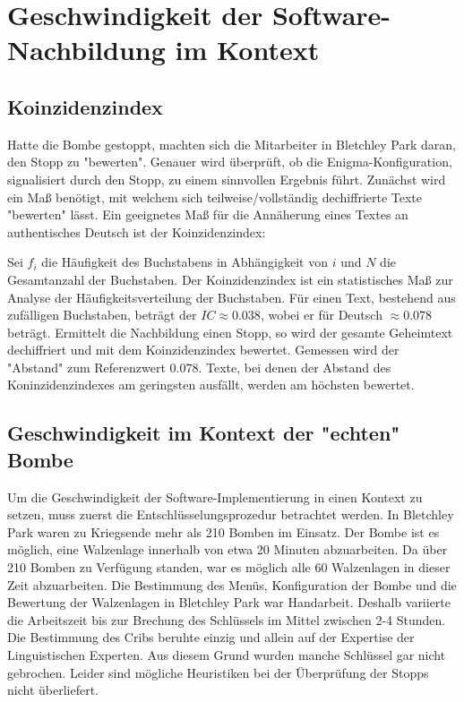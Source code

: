 \chapter{Geschwindigkeit der Software-Nachbildung im Kontext}\label{ch:speed}

\section{Koinzidenzindex}\label{sec:koinzidenzindex}
Hatte die Bombe gestoppt, machten sich die Mitarbeiter in Bletchley Park daran, den Stopp zu "bewerten". 
Genauer wird überprüft, ob die Enigma-Konfiguration, signalisiert durch den Stopp, zu einem sinnvollen Ergebnis führt.
Zunächst wird ein Maß benötigt, mit welchem sich teilweise/vollständig dechiffrierte Texte "bewerten" lässt.
Ein geeignetes Maß für die Annäherung eines Textes an authentisches Deutsch ist der Koinzidenzindex:

	
	
Sei $f_i$ die Häufigkeit des Buchstabens in Abhängigkeit von $i$ und $N$ die Gesamtanzahl der Buchstaben.
Der Koinzidenzindex ist ein statistisches Maß zur Analyse der Häufigkeitsverteilung der Buchstaben.
Für einen Text, bestehend aus zufälligen Buchstaben, beträgt der $IC \approx 0.038$, wobei er für Deutsch $\approx 0.078$ beträgt.
Ermittelt die Nachbildung einen Stopp, so wird der gesamte Geheimtext dechiffriert und mit dem Koinzidenzindex bewertet.
Gemessen wird der "Abstand" zum Referenzwert 0.078.
Texte, bei denen der Abstand des Koninzidenzindexes am geringsten ausfällt, werden am höchsten bewertet.


\section{Geschwindigkeit im Kontext der "echten" Bombe}\label{sec:speed}
Um die Geschwindigkeit der Software-Implementierung in einen Kontext zu setzen, muss zuerst die Entschlüsselungsprozedur betrachtet werden.
In Bletchley Park waren zu Kriegsende mehr als 210 Bomben im Einsatz.
Der Bombe ist es möglich, eine Walzenlage innerhalb von etwa 20 Minuten abzuarbeiten.
Da über 210 Bomben zu Verfügung standen, war es möglich alle 60 Walzenlagen in dieser Zeit abzuarbeiten.
Die Bestimmung des Menüs, Konfiguration der Bombe und die Bewertung der Walzenlagen in Bletchley Park war Handarbeit.
Deshalb variierte die Arbeitszeit bis zur Brechung des Schlüssels im Mittel zwischen 2-4 Stunden.
Die Bestimmung des Cribs beruhte einzig und allein auf der Expertise der Linguistischen Experten. 
Aus diesem Grund wurden manche Schlüssel gar nicht gebrochen.
Leider sind mögliche Heuristiken bei der Überprüfung der Stopps nicht überliefert.

